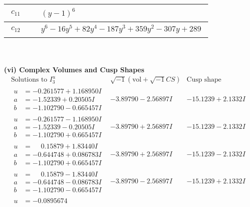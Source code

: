 \documentclass[1p]{elsarticle_modified}
\theoremstyle{definition}
\newcommand{\I}{\sqrt{-1}}
\begin{document}
\begin{tabular}{m{50pt}|m{274pt}}
\hline $$\begin{aligned}c_{11}\end{aligned}$$&$\begin{aligned}
&(y-1)^6
\end{aligned}$\\
\hline $$\begin{aligned}c_{12}\end{aligned}$$&$\begin{aligned}
&y^6-16 y^5+82 y^4-187 y^3+359 y^2-307 y+289
\end{aligned}$\\
\hline
\end{tabular}\\~\\
\newpage\flushleft \textbf{(vi) Complex Volumes and Cusp Shapes}
$$\begin{array}{c|c|c}  
\text{Solutions to }I^u_{3}& \I (\text{vol} + \sqrt{-1}CS) & \text{Cusp shape}\\
 \hline 
\begin{aligned}
u &= -0.261577 + 1.168950 I \\
a &= -1.52339 + 0.20505 I \\
b &= -1.102790 - 0.665457 I\end{aligned}
 & -3.89790 - 2.56897 I & -15.1239 + 2.1332 I \\ \hline\begin{aligned}
u &= -0.261577 - 1.168950 I \\
a &= -1.52339 - 0.20505 I \\
b &= -1.102790 + 0.665457 I\end{aligned}
 & -3.89790 + 2.56897 I & -15.1239 - 2.1332 I \\ \hline\begin{aligned}
u &= \phantom{-}0.15879 + 1.83440 I \\
a &= -0.644748 + 0.086783 I \\
b &= -1.102790 + 0.665457 I\end{aligned}
 & -3.89790 + 2.56897 I & -15.1239 - 2.1332 I \\ \hline\begin{aligned}
u &= \phantom{-}0.15879 - 1.83440 I \\
a &= -0.644748 - 0.086783 I \\
b &= -1.102790 - 0.665457 I\end{aligned}
 & -3.89790 - 2.56897 I & -15.1239 + 2.1332 I \\ \hline\begin{aligned}
u &= -0.0895674\phantom{ +0.000000I} \\

\end{aligned}
\end{array}$$
\end{document}
